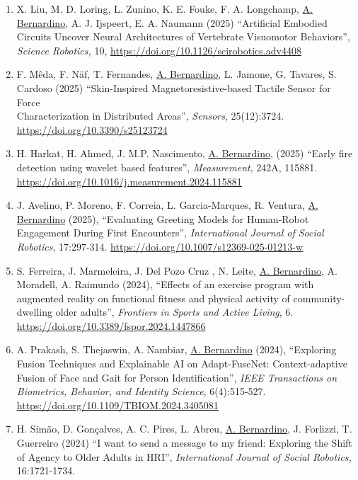 \documentclass[
]{article}
\begin{document}
\begin{enumerate}
  processing framework for water status monitoring in vineyards'',
  \emph{Computers and Electronics in Agriculture}, Volume 239, Part A,
  \url{https://doi.org/10.1016/j.compag.2025.110931}
\item
  X. Liu, M. D. Loring, L. Zunino, K. E. Fouke, F. A. Longchamp, \ul{A.
  Bernardino}, A. J. Ijspeert, E. A. Naumann (2025) ``Artificial
  Embodied Circuits Uncover Neural Architectures of Vertebrate
  Visuomotor Behaviors'', \emph{Science Robotics,} 10,
  \url{https://doi.org/10.1126/scirobotics.adv4408}
\item
  F. Mêda, F. Näf, T. Fernandes, \ul{A. Bernardino}, L. Jamone, G.
  Tavares, S. Cardoso (2025) ``Skin-Inspired Magnetoresistive-based
  Tactile Sensor for Force~\\
  Characterization in Distributed Areas'', \emph{Sensors}, 25(12):3724.
  \url{https://doi.org/10.3390/s25123724}
\item
  H. Harkat, H. Ahmed, J. M.P. Nascimento, \ul{A. Bernardino}, (2025)
  ``Early fire detection using wavelet based features'',
  \emph{Measurement}, 242A, 115881.
  \url{https://doi.org/10.1016/j.measurement.2024.115881}
\item
  J. Avelino, P. Moreno, F. Correia, L. Garcia-Marques, R. Ventura,
  \ul{A. Bernardino} (2025), ``Evaluating Greeting Models for
  Human-Robot Engagement During First Encounters'', \emph{International
  Journal of Social Robotics}, 17:297-314.
  \url{https://doi.org/10.1007/s12369-025-01213-w}
\item
  S. Ferreira, J. Marmeleira, J. Del Pozo Cruz , N. Leite, \ul{A.
  Bernardino}, A. Moradell, A. Raimundo (2024), ``Effects of an exercise
  program with augmented reality on functional fitness and physical
  activity of community-dwelling older adults'', \emph{Frontiers in
  Sports and Active Living}, 6.
  \url{https://doi.org/10.3389/fspor.2024.1447866}
\item
  A. Prakash, S. Thejaswin, A. Nambiar, \ul{A. Bernardino} (2024),
  ``Exploring Fusion Techniques and Explainable AI on Adapt-FuseNet:
  Context-adaptive Fusion of Face and Gait for Person Identification'',
  \emph{IEEE Transactions on Biometrics, Behavior, and Identity
  Science}, 6(4):515-527.
  \url{https://doi.org/10.1109/TBIOM.2024.3405081}
\item
  H. Simão, D. Gonçalves, A. C. Pires, L. Abreu, \ul{A. Bernardino}, J.
  Forlizzi, T. Guerreiro (2024) ``I want to send a message to my friend:
  Exploring the Shift of Agency to Older Adults in HRI'',
  \emph{International Journal of Social Robotics,} 16:1721-1734.

\end{enumerate}
\end{document}

